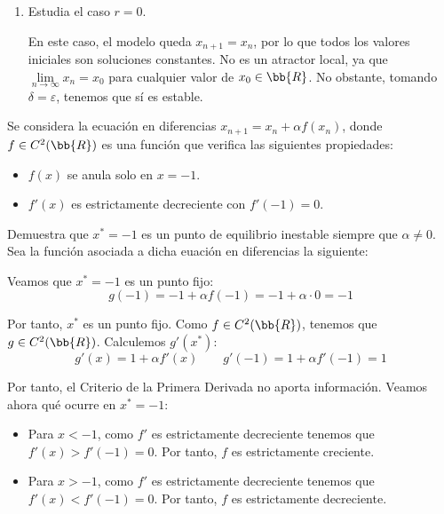 \begin{ejercicio}
\begin{enumerate}
        \item Estudia el caso $r = 0$.

        En este caso, el modelo queda $x_{n+1}=x_n$, por lo que todos los valores iniciales son soluciones constantes. No es un atractor local, ya que $\lim\limits_{n\to \infty}x_n = x_0$ para cualquier valor de $x_0\in \bb{R}$. No obstante, tomando $\delta=\varepsilon$, tenemos que sí es estable.
    \end{enumerate}
\end{ejercicio}

\begin{ejercicio}
    Se considera la ecuación en diferencias $x_{n+1} = x_n + \alpha f(x_n)$, donde $f \in C^2(\bb{R})$ es una función que verifica las siguientes propiedades:
    \begin{itemize}
        \item $f(x)$ se anula solo en $x = -1$.
        \item $f'(x)$ es estrictamente decreciente con $f'(-1) = 0$.
    \end{itemize}
    Demuestra que $x^\ast = -1$ es un punto de equilibrio inestable siempre que $\alpha\neq 0$.\\

    Sea la función asociada  a dicha euación en diferencias la siguiente:

    Veamos que $x^\ast=-1$ es un punto fijo:
    \begin{equation*}
        g(-1) = -1 + \alpha f(-1) = -1 + \alpha\cdot 0 = -1
    \end{equation*}

    Por tanto, $x^\ast$ es un punto fijo. Como $f\in C^2(\bb{R})$, tenemos que $g\in C^2(\bb{R})$. Calculemos $g'(x^\ast)$:
    \begin{equation*}
        g'(x) = 1+\alpha f'(x) \qquad g'(-1) = 1 + \alpha f'(-1) = 1
    \end{equation*}

    Por tanto, el Criterio de la Primera Derivada no aporta información. Veamos ahora qué ocurre en $x^\ast=-1$:
    \begin{itemize}
        \item Para $x<-1$, como $f'$ es estrictamente decreciente tenemos que $f'(x)>f'(-1)=0$. Por tanto, $f$ es estrictamente creciente.
        \item Para $x>-1$, como $f'$ es estrictamente decreciente tenemos que $f'(x)<f'(-1)=0$. Por tanto, $f$ es estrictamente decreciente.
    \end{itemize}


\end{ejercicio}

